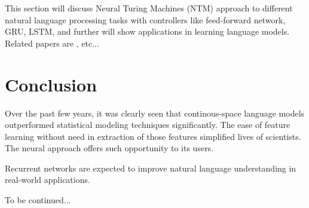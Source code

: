 \documentclass{IEEEtran}
\begin{document}
This section will discuss Neural Turing Machines (NTM) approach to different natural language processing tasks with controllers like feed-forward network, GRU, LSTM, and further will show applications in learning language models. Related papers are \cite{snips16}, etc...

\section{Conclusion}

Over the past few years, it was clearly seen that continous-space language models outperformed statistical modeling techniques significantly. The ease of feature learning without need in extraction of those features simplified lives of scientists. The neural approach offers such opportunity to its users.

Recurrent networks are expected to improve natural language understanding in real-world applications.

To be continued...




\printbibliography
\end{document}
